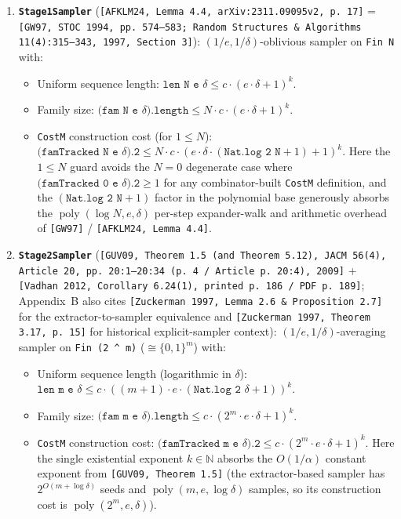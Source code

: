 \documentclass[10pt,letterpaper]{article}
\renewcommand{\_}{\origunderscore\allowbreak}
\newcommand{\code}[1]{\texttt{#1}}
\begin{document}
\begin{enumerate}
  \item \textbf{\code{Stage1Sampler}} (\code{[AFKLM24, Lemma 4.4, arXiv:2311.09095v2, p.~17]} = \code{[GW97, STOC 1994, pp.~574--583; Random Structures \& Algorithms 11(4):315--343, 1997, Section~3]}): $(1/e, 1/\delta)$-oblivious sampler on \code{Fin N} with:
  \begin{itemize}
    \item Uniform sequence length: $\code{len N e }\delta \le c \cdot (e \cdot \delta + 1)^k$.
    \item Family size: $\code{(fam N e }\delta\code{).length} \le N \cdot c \cdot (e \cdot \delta + 1)^k$.
    \item \code{CostM} construction cost (for $1 \le N$): $\code{(famTracked N e }\delta\code{).2} \le N \cdot c \cdot (e \cdot \delta \cdot (\code{Nat.log 2 N} + 1) + 1)^k$. Here the $1 \le N$ guard avoids the $N = 0$ degenerate case where $\code{(famTracked 0 e }\delta\code{).2} \ge 1$ for any combinator-built \code{CostM} definition, and the $(\code{Nat.log 2 N} + 1)$ factor in the polynomial base generously absorbs the $\operatorname{poly}(\log N, e, \delta)$ per-step expander-walk and arithmetic overhead of \code{[GW97]} / \code{[AFKLM24, Lemma 4.4]}.
  \end{itemize}

  \item \textbf{\code{Stage2Sampler}} (\code{[GUV09, Theorem 1.5 (and Theorem 5.12), JACM 56(4), Article 20, pp.~20:1--20:34 (p.~4 / Article p.~20:4), 2009]} + \code{[Vadhan 2012, Corollary 6.24(1), printed p.~186 / PDF p.~189]}; Appendix~B also cites \code{[Zuckerman 1997, Lemma 2.6 \& Proposition 2.7]} for the extractor-to-sampler equivalence and \code{[Zuckerman 1997, Theorem 3.17, p.~15]} for historical explicit-sampler context): $(1/e, 1/\delta)$-averaging sampler on \code{Fin (2 \^{} m)} ($\cong \{0,1\}^m$) with:
  \begin{itemize}
    \item Uniform sequence length (logarithmic in $\delta$): $\code{len m e }\delta \le c \cdot ((m + 1) \cdot e \cdot (\code{Nat.log 2 }\delta + 1))^k$.
    \item Family size: $\code{(fam m e }\delta\code{).length} \le c \cdot (2^m \cdot e \cdot \delta + 1)^k$.
    \item \code{CostM} construction cost: $\code{(famTracked m e }\delta\code{).2} \le c \cdot (2^m \cdot e \cdot \delta + 1)^k$. Here the single existential exponent $k \in \mathbb{N}$ absorbs the $O(1/\alpha)$ constant exponent from \code{[GUV09, Theorem 1.5]} (the extractor-based sampler has $2^{O(m + \log\delta)}$ seeds and $\operatorname{poly}(m, e, \log\delta)$ samples, so its construction cost is $\operatorname{poly}(2^m, e, \delta)$).
  \end{itemize}


\end{enumerate}
\end{document}
